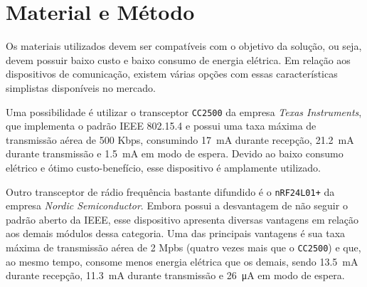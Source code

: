 \documentclass[
    12pt,               %
    a4paper,            %
    english,            %
    brazil,             %
    ]{article}
\begin{document}


\section{Material e Método}

Os materiais utilizados devem ser compatíveis com o objetivo da solução, ou seja, devem possuir baixo custo e baixo consumo de
energia elétrica. Em relação aos dispositivos de comunicação, existem várias opções com essas características simplistas
disponíveis no mercado.

Uma possibilidade é utilizar o transceptor \texttt{CC2500} da empresa \textit{Texas Instruments}, que implementa o padrão IEEE
802.15.4 e possui uma taxa máxima de transmissão aérea de 500 Kbps, consumindo \SI{17}{\milli \ampere} durante recepção,
\SI{21.2}{\milli \ampere} durante transmissão e \SI{1.5}{\milli \ampere} em modo de espera. Devido ao baixo consumo elétrico e
ótimo custo-benefício, esse dispositivo é amplamente utilizado. \cite{ccdatasheet}

Outro transceptor de rádio frequência bastante difundido é o \texttt{nRF24L01+} da empresa \textit{Nordic Semiconductor}. Embora
possui a desvantagem de não seguir o padrão aberto da IEEE, esse dispositivo apresenta diversas vantagens em relação aos demais
módulos dessa categoria. Uma das principais vantagens é sua taxa máxima de transmissão aérea de 2 Mpbs (quatro vezes mais que o
\texttt{CC2500}) e que, ao mesmo tempo, consome menos energia elétrica que os demais, sendo \SI{13.5}{\milli \ampere} durante
recepção, \SI{11.3}{\milli \ampere} durante transmissão e \SI{26}{\micro \ampere} em modo de espera.  \cite{nrfdatasheet}
\end{document}

